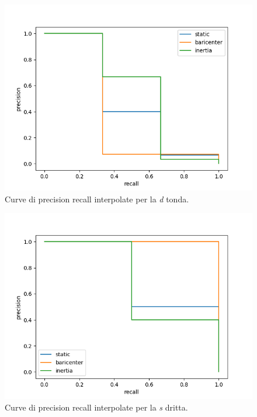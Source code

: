 \begin{figure}
    \centering
    \includegraphics[width=.9\textwidth]{figures/graphs/D_tondaFalseinterpolated.png}
    \caption{Curve di precision recall interpolate per la \emph{d} tonda.}
    \label{fig:graph_D_tonda_interpolated}
\end{figure}

\begin{figure}
    \centering
    \includegraphics[width=.9\textwidth]{figures/graphs/S_drittaFalseinterpolated.png}
    \caption{Curve di precision recall interpolate per la \emph{s} dritta.}
    \label{fig:graph_S_dritta_interpolated}
\end{figure}

